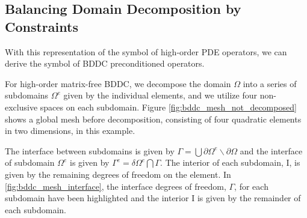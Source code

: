 \documentclass[review]{siamart190516}
\begin{document}
\subsection{Balancing Domain Decomposition by Constraints}\label{sec:lfabddc}

With this representation of the symbol of high-order PDE operators, we can derive the symbol of BDDC preconditioned operators.

For high-order matrix-free BDDC, we decompose the domain $\Omega$ into a series of subdomains $\Omega^e$ given by the individual elements, and we utilize four non-exclusive spaces on each subdomain.
Figure \ref{fig:bddc_mesh_not_decomposed} shows a global mesh before decomposition, consisting of four quadratic elements in two dimensions, in this example.

The interface between subdomains is given by $\Gamma = \bigcup \partial \Omega^e \backslash \partial \Omega$ and the interface of subdomain $\Omega^e$ is given by $\Gamma^e = \delta \Omega^e \bigcap \Gamma$.
The interior of each subdomain, $\text{I}$, is given by the remaining degrees of freedom on the element.
In \cref{fig:bddc_mesh_interface}, the interface degrees of freedom, $\Gamma$, for each subdomain have been highlighted and the interior $\text{I}$ is given by the remainder of each subdomain.
\end{document}
